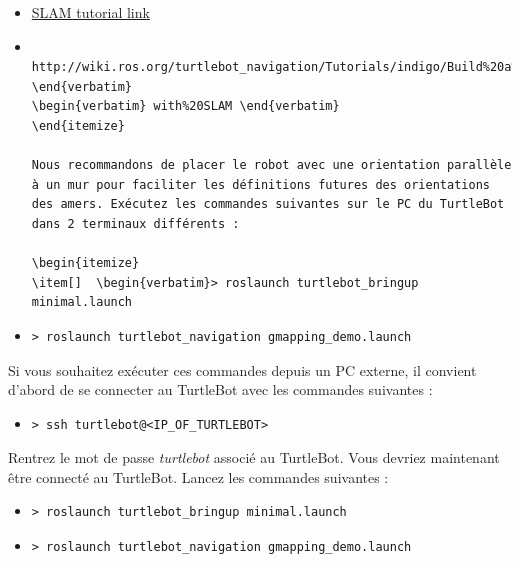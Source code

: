 \documentclass[10pt,a4paper]{article}
\begin{document}
\begin{itemize}
\item[•] \href{http://wiki.ros.org/turtlebot_navigation/Tutorials/indigo/Build%20a%20map%20with%20SLAM}{SLAM tutorial link} 
\item[ ] \begin{verbatim} http://wiki.ros.org/turtlebot_navigation/Tutorials/indigo/Build%20a%20map%20 \end{verbatim} 
\begin{verbatim} with%20SLAM \end{verbatim}
\end{itemize}

Nous recommandons de placer le robot avec une orientation parallèle à un mur pour faciliter les définitions futures des orientations des amers. Exécutez les commandes suivantes sur le PC du TurtleBot dans 2 terminaux différents :

\begin{itemize}
\item[]  \begin{verbatim}> roslaunch turtlebot_bringup minimal.launch \end{verbatim}
\item[]  \begin{verbatim}> roslaunch turtlebot_navigation gmapping_demo.launch \end{verbatim}
\end{itemize}

\newpage
Si vous souhaitez exécuter ces commandes depuis un PC externe, il convient d'abord de se connecter au TurtleBot avec les commandes suivantes :
\begin{itemize}
\item[] \begin{verbatim}> ssh turtlebot@<IP_OF_TURTLEBOT> \end{verbatim}
\end{itemize}
Rentrez le mot de passe \upshape \emph{turtlebot} associé au TurtleBot. Vous devriez maintenant être connecté au TurtleBot. Lancez les commandes suivantes :
\begin{itemize}
\item[]  \begin{verbatim}> roslaunch turtlebot_bringup minimal.launch \end{verbatim}
\item[]  \begin{verbatim}> roslaunch turtlebot_navigation gmapping_demo.launch \end{verbatim}
\end{itemize}
\end{document}
